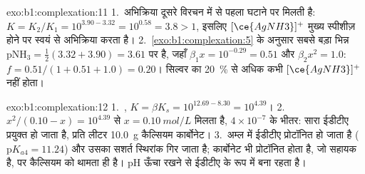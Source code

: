\begin{solution}{exo:b1:complexation:11}
1.~अभिक्रिया दूसरे विरचन में से पहला घटाने पर मिलती है: $K = K_2/K_1 =
10^{3.90 - 3.32} = 10^{0.58} = 3.8 > 1$, इसलिए $[\ce{AgNH3}]^{+}$ मुख्य
स्पीशीज़ होने पर स्वयं से अभिक्रिया करता है।
2.~\cref{exo:b1:complexation:5} के अनुसार सबसे बड़ा भिन्न
$\mathrm{pNH_3} = \frac12(3.32 + 3.90) = 3.61$ पर है, जहाँ $\beta_1 x = 10^{-0.29}
= 0.51$ और $\beta_2x^2 = 1.0$: $f = 0.51/(1 + 0.51 + 1.0) = 0.20$। सिल्वर का
\qty{20}{\percent} से अधिक कभी $[\ce{AgNH3}]^{+}$ नहीं होता।
\end{solution}

\begin{solution}{exo:b1:complexation:12}
1.~, $K = \beta K_s = 10^{12.69 -
8.30} = 10^{4.39}$।
2.~$x^2/(0.10 - x) = 10^{4.39}$ से $x = \qty{0.10}{mol/L}$ मिलता है,
$4 \times 10^{-7}$ के भीतर: सारा ईडीटीए प्रयुक्त हो जाता है, प्रति लीटर \qty{10.0}{g} कैल्सियम
कार्बोनेट।
3.~अम्ल में ईडीटीए प्रोटॉनित हो जाता है ($\mathrm{p}K_{a4} = 11.24$) और उसका
सशर्त स्थिरांक गिर जाता है; कार्बोनेट भी प्रोटॉनित होता है, जो सहायक है,
पर कैल्सियम को थामता  ही है। pH ऊँचा रखने से
ईडीटीए  के रूप में बना रहता है।
\end{solution}

